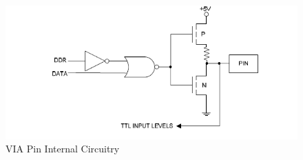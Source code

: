 \begin{figure}[ht]
    \begin{center}
        \includegraphics[scale=0.65]{images/via_pin_drivers.png}
    \end{center}
    \caption{VIA Pin Internal Circuitry}
    \label{fig:via_pin}
\end{figure}